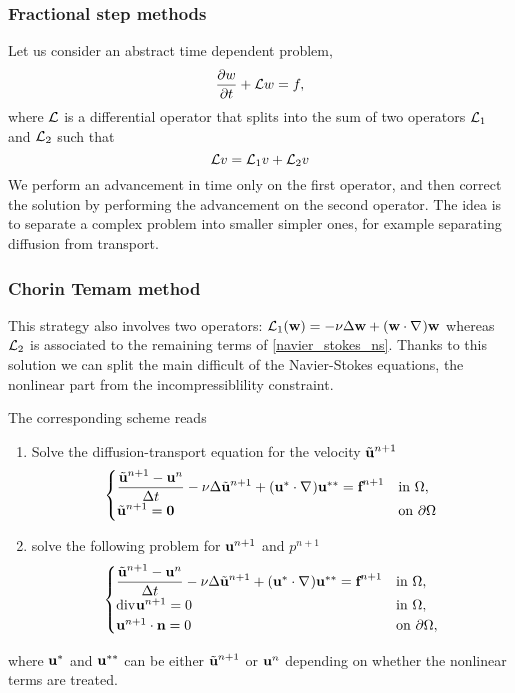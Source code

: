 \subsubsection*{Fractional step methods}
Let us consider an abstract time dependent problem,
\[
    \partialderivative{w}{t} + \loperator w = f,
\]
where \(\mathcal{L}\) is a differential operator that splits into the sum of two operators \(\mathcal{L}_1\) and \(\mathcal{L}_2\) such that
\[
    \mathcal{L} v = \mathcal{L}_1 v + \mathcal{L}_2 v
\]
We perform an advancement in time only on the first operator, and then correct the solution by performing the advancement on the second operator. The idea is to separate a complex problem into smaller simpler ones, for example separating diffusion from transport.
\subsubsection*{Chorin Temam method}
This strategy also involves two operators: \(\mathcal{L}_1(\textbf{w}) = -\nu\Delta \textbf{w} + (\textbf{w} \cdot \nabla\mspace{1mu})\textbf{w}\) whereas \(\mathcal{L}_2\) is associated to the remaining terms of \eqref{navier_stokes_ns}. Thanks to this solution we can split the main difficult of the Navier-Stokes equations, the nonlinear part from the incompressiblility constraint.

The corresponding scheme reads 
\begin{enumerate}
    \item Solve the diffusion-transport equation for the velocity \(\tilde{\textbf{u}}^{n+1}\)
    \begin{equation}
        \begin{cases}
            \dfrac{\tilde{\textbf{u}}^{n+1}-\textbf{u}^n}{\Delta t} -\nu\Delta \tilde{\textbf{u}}^{n+1} + (\textbf{u}^* \cdot \nabla\mspace{1mu})\textbf{u}^{**} = \textbf{f}^{n+1} & \text{in }\Omega, \\
            \tilde{\textbf{u}}^{n+1} = \textbf{0} & \text{on }{\partial\Omega}
        \end{cases}
        \label{63_slide_ns}
    \end{equation}
    \item solve the following problem for \(\textbf{u}^{n+1}\) and \(p^{n+1}\)
    \begin{equation}
        \begin{cases}
            \dfrac{\tilde{\textbf{u}}^{n+1}-\textbf{u}^n}{\Delta t} -\nu \Delta \tilde{\textbf{u}}^{n+1} + (\textbf{u}^* \cdot \nabla\mspace{1mu})\textbf{u}^{**} = \textbf{f}^{n+1} & \text{in }\Omega, \\
            \text{div}\mspace{1mu} \textbf{u}^{n+1} = 0 & \text{in } \Omega, \\
            \textbf{u}^{n+1} \cdot \textbf{n} = 0 & \text{on }{\partial\Omega},
        \end{cases}
        \label{64_slide_ns}
    \end{equation}
\end{enumerate}
where \(\textbf{u}^*\) and \(\textbf{u}^{**}\) can be either \(\tilde{\textbf{u}}^{n+1}\) or \(\textbf{u}^n\) depending on whether the nonlinear terms are treated.

